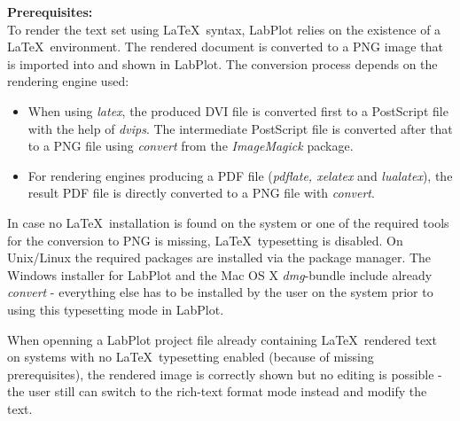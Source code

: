 \textbf{Prerequisites:}\\
To render the text set using \LaTeX\, syntax, LabPlot relies on the existence of a \LaTeX\, environment. The rendered document is converted to a PNG image that is imported into and shown in LabPlot. The conversion process depends on the rendering engine used:
\begin{itemize}
\item When using \textit{latex}, the produced DVI file is converted first to a PostScript file with the help of \textit{dvips}. The intermediate PostScript file is converted after that to a PNG file using \textit{convert} from the \textit{ImageMagick} package.
\item For rendering engines producing a PDF file (\textit{pdflate, xelatex} and \textit{lualatex}), the result PDF file is directly converted to a PNG file with \textit{convert}.
\end{itemize}

In case no \LaTeX\, installation is found on the system or one of the required tools for the conversion to PNG is missing, \LaTeX\, typesetting is disabled. On Unix/Linux the required packages are installed via the package manager. The Windows installer for LabPlot and the Mac OS X \textit{dmg}-bundle include already \textit{convert} - everything else has to be installed by the user on the system prior to using this typesetting mode in LabPlot.

When openning a LabPlot project file already containing \LaTeX\, rendered text on systems with no \LaTeX\, typesetting enabled (because of missing prerequisites), the rendered image is  correctly shown but no editing is possible - the user still can switch to the rich-text format mode instead and modify the text.


